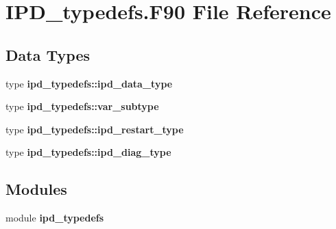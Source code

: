 \section{I\+P\+D\+\_\+typedefs.\+F90 File Reference}
\label{_i_p_d__typedefs_8_f90}
\subsection*{Data Types}
\begin{DoxyCompactItemize}
\item 
type \textbf{ ipd\+\_\+typedefs\+::ipd\+\_\+data\+\_\+type}
\item 
type \textbf{ ipd\+\_\+typedefs\+::var\+\_\+subtype}
\item 
type \textbf{ ipd\+\_\+typedefs\+::ipd\+\_\+restart\+\_\+type}
\item 
type \textbf{ ipd\+\_\+typedefs\+::ipd\+\_\+diag\+\_\+type}
\end{DoxyCompactItemize}
\subsection*{Modules}
\begin{DoxyCompactItemize}
\item 
module \textbf{ ipd\+\_\+typedefs}
\end{DoxyCompactItemize}
